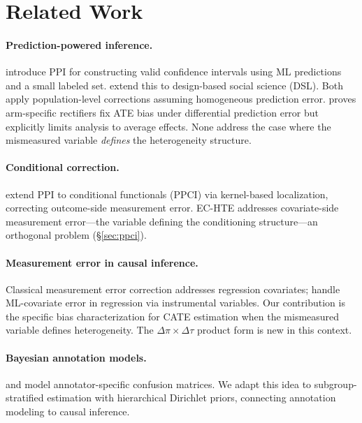 \documentclass[11pt,a4paper]{article}
\begin{document}
\section{Related Work}

\paragraph{Prediction-powered inference.} \citet{angelopoulos2023ppi} introduce PPI for constructing valid confidence intervals using ML predictions and a small labeled set. \citet{egami2024dsl} extend this to design-based social science (DSL). Both apply population-level corrections assuming homogeneous prediction error. \citet{mozer2026arm} proves arm-specific rectifiers fix ATE bias under differential prediction error but explicitly limits analysis to average effects. None address the case where the mismeasured variable \emph{defines} the heterogeneity structure.

\paragraph{Conditional correction.} \citet{sui2026ppci} extend PPI to conditional functionals (PPCI) via kernel-based localization, correcting outcome-side measurement error. EC-HTE addresses covariate-side measurement error---the variable defining the conditioning structure---an orthogonal problem (\S\ref{sec:ppci}).

\paragraph{Measurement error in causal inference.} Classical measurement error correction \citep{carroll2006measurement} addresses regression covariates; \citet{bu2023forestiv} handle ML-covariate error in regression via instrumental variables. Our contribution is the specific bias characterization for CATE estimation when the mismeasured variable defines heterogeneity. The $\Delta\pi \times \Delta\tau$ product form is new in this context.

\paragraph{Bayesian annotation models.} \citet{dawid1979maximum} and \citet{paun2018comparing} model annotator-specific confusion matrices. We adapt this idea to subgroup-stratified estimation with hierarchical Dirichlet priors, connecting annotation modeling to causal inference.
\end{document}
